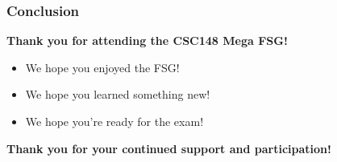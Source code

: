 \documentclass[hyperref={colorlinks,citecolor=blue,linkcolor=blue,urlcolor=blue}, aspectratio=1610]{beamer}
\begin{document}
\begin{frame}
  \frametitle{Conclusion}
\begin{center}
  \textbf{Thank you for attending the CSC148 Mega FSG!}
  \end{center}
  \begin{itemize}
    \item We hope you enjoyed the FSG!
    \item We hope you learned something new!
    \item We hope you're ready for the exam!
  \end{itemize}
  \textbf{Thank you for your continued support and participation!}
\end{frame}
\end{document}
